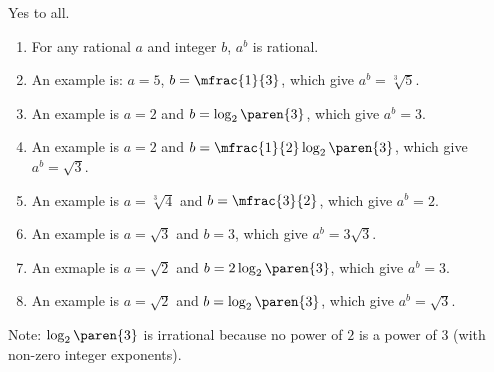 Yes to all.
\begin{enumerate}
 \item For any rational $a$ and integer $b$, $a^b$ is rational.
 \item An example is: $a = 5$, $b = \mfrac{1}{3}$, which give $a^b = \sqrt[3]{5}$.
 \item An example is $a = 2$ and $b = \log_2\paren{3}$, which give $a^b = 3$.
 \item An example is $a = 2$ and $b = \mfrac{1}{2}\log_2\paren{3}$, which give $a^b = \sqrt{3}$.
 \item An example is $a = \sqrt[3]{4}$ and $b = \mfrac{3}{2}$, which give $a^b = 2$.
 \item An example is $a = \sqrt{3}$ and $b = 3$, which give $a^b = 3 \sqrt{3}$.
 \item An exmaple is $a = \sqrt{2}$ and $b = 2 \log_2\paren{3}$, which give $a^b = 3$.
 \item An example is $a = \sqrt{2}$ and $b = \log_2\paren{3}$, which give $a^b = \sqrt{3}$.
\end{enumerate}
Note: $\log_2\paren{3}$ is irrational because no power of $2$ is a power of $3$ (with non-zero integer exponents).
